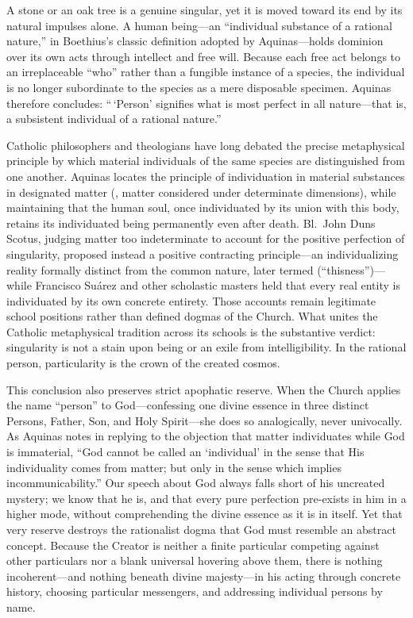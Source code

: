 A stone or an oak tree is a genuine singular, yet it is moved toward its end by its natural impulses alone. A human being---an ``individual substance of a rational nature,'' in Boethius's classic definition adopted by Aquinas---holds dominion over its own acts through intellect and free will. Because each free act belongs to an irreplaceable ``who'' rather than a fungible instance of a species, the individual is no longer subordinate to the species as a mere disposable specimen. Aquinas therefore concludes: ``\,`Person' signifies what is most perfect in all nature---that is, a subsistent individual of a rational nature.''

Catholic philosophers and theologians have long debated the precise metaphysical principle by which material individuals of the same species are distinguished from one another. Aquinas locates the principle of individuation in material substances in designated matter (, matter considered under determinate dimensions), while maintaining that the human soul, once individuated by its union with this body, retains its individuated being permanently even after death. Bl.\ John Duns Scotus, judging matter too indeterminate to account for the positive perfection of singularity, proposed instead a positive contracting principle---an individualizing reality formally distinct from the common nature, later termed  (``thisness'')---while Francisco Su\'arez and other scholastic masters held that every real entity is individuated by its own concrete entirety. Those accounts remain legitimate school positions rather than defined dogmas of the Church. What unites the Catholic metaphysical tradition across its schools is the substantive verdict: singularity is not a stain upon being or an exile from intelligibility. In the rational person, particularity is the crown of the created cosmos.

This conclusion also preserves strict apophatic reserve. When the Church applies the name ``person'' to God---confessing one divine essence in three distinct Persons, Father, Son, and Holy Spirit---she does so analogically, never univocally. As Aquinas notes in replying to the objection that matter individuates while God is immaterial, ``God cannot be called an `individual' in the sense that His individuality comes from matter; but only in the sense which implies incommunicability.'' Our speech about God always falls short of his uncreated mystery; we know that he is, and that every pure perfection pre-exists in him in a higher mode, without comprehending the divine essence as it is in itself. Yet that very reserve destroys the rationalist dogma that God must resemble an abstract concept. Because the Creator is neither a finite particular competing against other particulars nor a blank universal hovering above them, there is nothing incoherent---and nothing beneath divine majesty---in his acting through concrete history, choosing particular messengers, and addressing individual persons by name.
